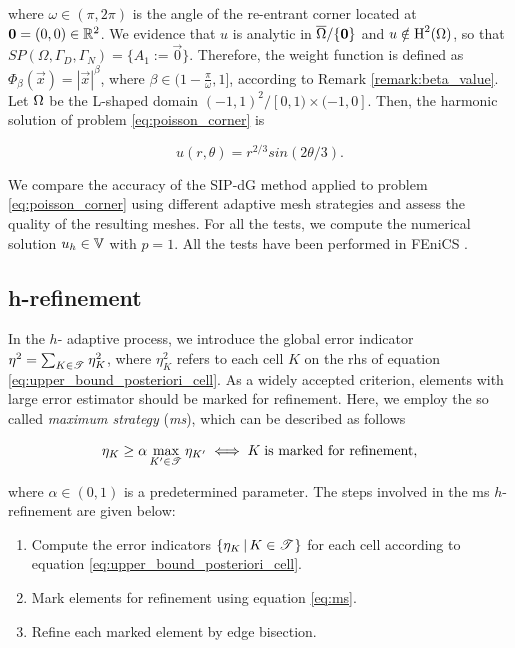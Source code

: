 \documentclass[a4paper,11pt]{article}
\begin{document}
where $\omega \in (\pi,2\pi)$ is the angle of the re-entrant corner located at $\boldsymbol 0 = (0,0) \in \mathbb R^{2}$. 
We evidence that $u$ is analytic in $\overline{\Omega}\slash\{\boldsymbol 0\}$ and $u \notin \operatorname H^{2}(\Omega)$, so that $\textit{SP}(\Omega,\Gamma_{D},\Gamma_{N}) = \{A_{1} := \vec{0}\}$. Therefore, the weight function is defined as $\Phi_{\beta}(\vec{x}) = |\vec{x}|^{\beta}$, where $\beta \in (1 - \frac{\pi}{\omega},1]$, according to Remark \ref{remark:beta_value}. Let $\Omega$ be the L-shaped domain $ (-1,1)^{2} \slash [0,1) \times (-1,0]$. Then, the harmonic solution of problem \eqref{eq:poisson_corner} is 

\begin{equation}
    u(r,\theta) = r^{2/3} sin(2\theta/3).
\label{eq:exact_solution_laplace}
\end{equation}

We compare the accuracy of the SIP-dG method applied to problem \eqref{eq:poisson_corner} using different adaptive mesh strategies and assess the quality of the resulting meshes. For all the tests, we compute the numerical solution $u_{h} \in \mathbb V$ with $p=1$. All the tests have been performed in FEniCS \cite{Logg:2010}.

\subsection{h-refinement}

In the $h$- adaptive process, we introduce the global error indicator $\eta^{2} = \sum_{K \in \mathscr T^{}} \eta_{K}^{2}$, where $\eta_{K}^{2}$ refers to each cell $K$ on the rhs of equation \eqref{eq:upper_bound_posteriori_cell}. As a widely accepted criterion, elements with large error estimator should be marked for refinement. Here, we employ the so called \textit{maximum strategy} (\textit{ms}), which can be described as follows

\begin{equation}
    \eta_{K} \geq \alpha \max_{K' \in \mathscr T^{}} \eta_{K'} \iff K \; \text{is marked for refinement},
\label{eq:ms}
\end{equation}

where $\alpha \in (0,1)$ is a predetermined parameter. The steps involved in the ms $h$-refinement are given below:

\begin{enumerate}
    \item Compute the error indicators $\{ \eta_{K} \, | \, K \in \mathscr T^{}  \}$ for each cell according to equation \eqref{eq:upper_bound_posteriori_cell}.

    \item Mark elements for refinement using equation \eqref{eq:ms}.
    
    \item Refine each marked element by edge bisection.
    
\end{enumerate}
\end{document}
